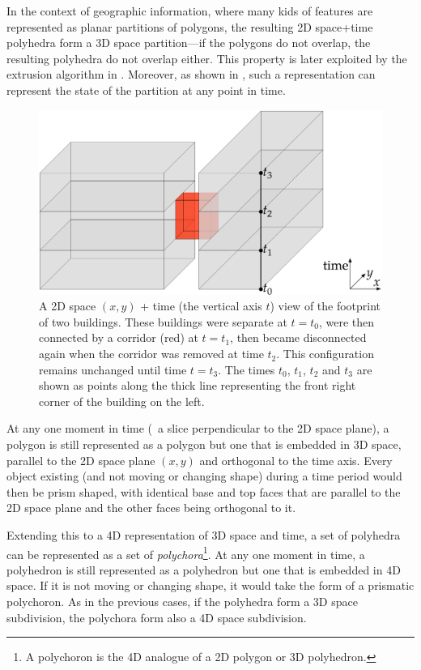 In the context of geographic information, where many kids of features are represented as planar partitions of polygons, the resulting 2D space+time polyhedra form a 3D space partition---if the polygons do not overlap, the resulting polyhedra do not overlap either.
This property is later exploited by the extrusion algorithm in .
Moreover, as shown in , such a representation can represent the state of the partition at any point in time.
\begin{figure}[tbp]
\begin{center}
\includegraphics[width=0.85\linewidth]{figs/2d+time}
\caption[A 3D representation of 2D space+time]{A 2D space $(x,y)$ + time (the vertical axis $t$) view of the footprint of two buildings. These buildings were separate at $t = t_{0}$, were then connected by a corridor (red) at $t = t_{1}$, then became disconnected again when the corridor was removed at time $t_{2}$. This configuration remains unchanged until time $t = t_{3}$. The times $t_0$, $t_1$, $t_2$ and $t_3$ are shown as points along the thick line representing the front right corner of the building on the left.}
\label{fig:2d+time}
\end{center}
\end{figure}
At any one moment in time (\ie\ a slice perpendicular to the 2D space plane), a polygon is still represented as a polygon but one that is embedded in 3D space, parallel to the 2D space plane $(x,y)$ and orthogonal to the time axis.
Every object existing (and not moving or changing shape) during a time period would then be prism shaped, with identical base and top faces that are parallel to the 2D space plane and the other faces being orthogonal to it.

Extending this to a 4D representation of 3D space and time, a set of polyhedra can be represented as a set of \emph{polychora}\footnote{A polychoron is the 4D analogue of a 2D polygon or 3D polyhedron.}.
At any one moment in time, a polyhedron is still represented as a polyhedron but one that is embedded in 4D space.
If it is not moving or changing shape, it would take the form of a prismatic polychoron.
As in the previous cases, if the polyhedra form a 3D space subdivision, the polychora form also a 4D space subdivision.

